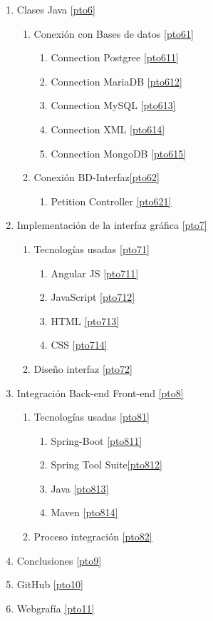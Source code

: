 \documentclass[12pt,a4paper]{article}
\begin{document}
\begin{enumerate}
\item Clases Java \ref{pto6}
	\begin{enumerate}[label*=\arabic*.]
	\item Conexión con Bases de datos \ref{pto61}
		\begin{enumerate}[label*=\arabic*.]
		\item Connection Postgree \ref{pto611}
		\item Connection MariaDB \ref{pto612}
		\item Connection MySQL \ref{pto613}
		\item Connection XML \ref{pto614}
		\item Connection MongoDB \ref{pto615}
		\end{enumerate}
	\item Conexión BD-Interfaz\ref{pto62}
		\begin{enumerate}[label*=\arabic*.]
		\item Petition Controller \ref{pto621}
		\end{enumerate}
	\end{enumerate}

\item Implementación de la interfaz gráfica  \ref{pto7}
		\begin{enumerate}[label*=\arabic*.]
		\item Tecnologías usadas \ref{pto71}
			\begin{enumerate}[label*=\arabic*.]
			\item Angular JS \ref{pto711}
			\item JavaScript \ref{pto712}
			\item HTML \ref{pto713}
			\item CSS \ref{pto714}
			\end{enumerate}
		\item Diseño interfaz \ref{pto72}
			
		\end{enumerate}

\item Integración Back-end Front-end \ref{pto8}
	\begin{enumerate}[label*=\arabic*.]
	\item Tecnologías usadas \ref{pto81}
		\begin{enumerate}[label*=\arabic*.]
			\item Spring-Boot \ref{pto811}
			\item Spring Tool Suite\ref{pto812}
			\item Java \ref{pto813}
			\item Maven \ref{pto814}
		\end{enumerate}
	\item Proceso integración \ref{pto82}
	\end{enumerate}



\item Conclusiones  \ref{pto9}
\item GitHub \ref{pto10}
\item Webgrafía \ref{pto11} 
\end{enumerate}
\end{document}
